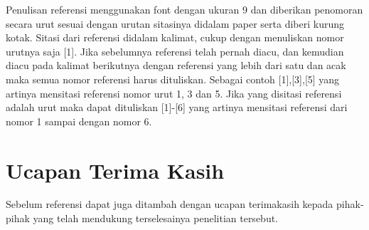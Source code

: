 \documentclass[12pt,reqno]{semhas-tesis-filkom}
\begin{document}
Penulisan referensi menggunakan font dengan ukuran 9 dan diberikan penomoran secara urut sesuai dengan urutan sitasinya didalam paper serta diberi kurung kotak. Sitasi dari referensi didalam kalimat, cukup dengan menuliskan nomor urutnya saja [1]. Jika sebelumnya referensi telah pernah diacu, dan kemudian diacu pada kalimat berikutnya dengan referensi yang lebih dari satu dan acak maka semua nomor referensi harus dituliskan. Sebagai contoh [1],[3],[5] yang artinya mensitasi referensi nomor urut 1, 3 dan 5. Jika yang disitasi referensi adalah urut maka dapat dituliskan [1]-[6] yang artinya mensitasi referensi dari nomor 1 sampai dengan nomor 6.

\section*{Ucapan Terima Kasih}

Sebelum referensi dapat juga ditambah dengan ucapan
terimakasih kepada pihak-pihak yang telah mendukung
terselesainya penelitian tersebut.

\vspace*{1em}
\balance

\renewcommand{\refname}{\centering\NoCaseChange\itshape{Referensi}\vspace*{1em}}



\end{document}
